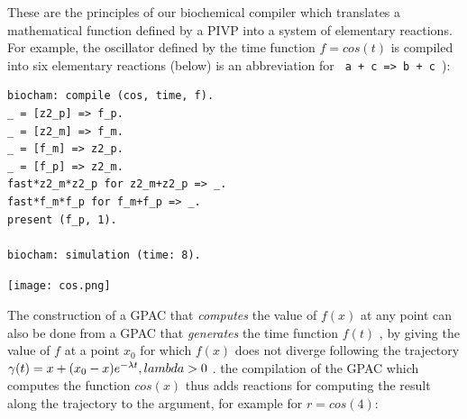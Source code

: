 \documentclass[graybox]{svmult}
\begin{document}
These are the principles of our biochemical compiler which translates a mathematical function defined by a PIVP into a system of elementary reactions.
For example, the oscillator defined by the time function $ f = cos (t) $ is compiled into six elementary reactions
(below) is an abbreviation for {\small \verb | a + c => b + c |}):\\

\noindent
\begin{minipage} [b]{5cm}
\scriptsize
\begin{verbatim}
biocham: compile (cos, time, f).
_ = [z2_p] => f_p.
_ = [z2_m] => f_m.
_ = [f_m] => z2_p.
_ = [f_p] => z2_m.
fast*z2_m*z2_p for z2_m+z2_p => _.
fast*f_m*f_p for f_m+f_p => _.
present (f_p, 1).

biocham: simulation (time: 8).
\end{verbatim}
\end{minipage}

\vspace{-2.8cm} \hfill \texttt{[image: cos.png]}


The construction of a GPAC that \emph{computes} the value of $ f (x) $ at any point can also be done from a GPAC that \emph{generates} the time function $ f (t) $ ,
by giving the value of $ f $ at a point $ x_0 $ for which $ f (x) $ does not diverge following the trajectory $ \gamma (t) = x + (x_0-x) e ^{- \lambda t }, \\lambda> 0 $ \cite{Pouly15}.
the compilation of the GPAC which computes the function $ cos (x) $ thus adds reactions for computing the result along the trajectory to the argument, for example for $ r = cos (4) $: \\
\end{document}
